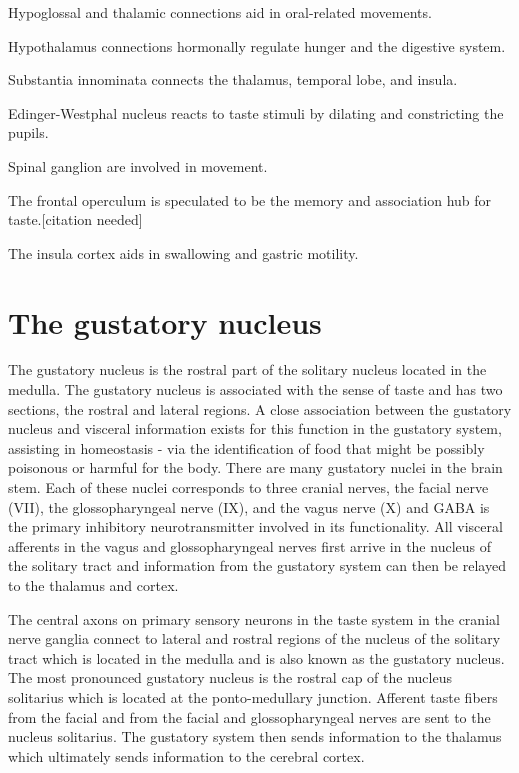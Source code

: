 \documentclass[]{book}
\begin{document}
Hypoglossal and thalamic connections aid in oral-related movements.

Hypothalamus connections hormonally regulate hunger and the digestive system.

Substantia innominata connects the thalamus, temporal lobe, and insula.

Edinger-Westphal nucleus reacts to taste stimuli by dilating and constricting the pupils.

Spinal ganglion are involved in movement.

The frontal operculum is speculated to be the memory and association hub for taste.{[}citation needed{]}

The insula cortex aids in swallowing and gastric motility.

\hypertarget{the-gustatory-nucleus}{%
\section{The gustatory nucleus}\label{the-gustatory-nucleus}}

The gustatory nucleus is the rostral part of the solitary nucleus located in the medulla. The gustatory nucleus is associated with the sense of taste and has two sections, the rostral and lateral regions. A close association between the gustatory nucleus and visceral information exists for this function in the gustatory system, assisting in homeostasis - via the identification of food that might be possibly poisonous or harmful for the body. There are many gustatory nuclei in the brain stem. Each of these nuclei corresponds to three cranial nerves, the facial nerve (VII), the glossopharyngeal nerve (IX), and the vagus nerve (X) and GABA is the primary inhibitory neurotransmitter involved in its functionality. All visceral afferents in the vagus and glossopharyngeal nerves first arrive in the nucleus of the solitary tract and information from the gustatory system can then be relayed to the thalamus and cortex.

The central axons on primary sensory neurons in the taste system in the cranial nerve ganglia connect to lateral and rostral regions of the nucleus of the solitary tract which is located in the medulla and is also known as the gustatory nucleus. The most pronounced gustatory nucleus is the rostral cap of the nucleus solitarius which is located at the ponto-medullary junction. Afferent taste fibers from the facial and from the facial and glossopharyngeal nerves are sent to the nucleus solitarius. The gustatory system then sends information to the thalamus which ultimately sends information to the cerebral cortex.
\end{document}
